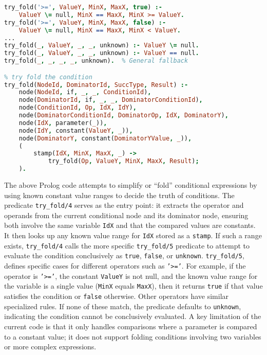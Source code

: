 \begin{lstlisting}[language=Prolog]
% Constant condition: value stamp available and deterministic
try_fold('>=', ValueY, MinX, MaxX, true) :- 
    ValueY \= null, MinX == MaxX, MinX >= ValueY.
try_fold('>=', ValueY, MinX, MaxX, false) :- 
    ValueY \= null, MinX == MaxX, MinX < ValueY.
...
try_fold(_, ValueY, _, _, unknown) :- ValueY \= null.
try_fold(_, ValueY, _, _, unknown) :- ValueY == null.
try_fold(_, _, _, _, unknown).  % General fallback

% try fold the condition
try_fold(NodeId, DominatorId, SuccType, Result) :-
    node(NodeId, if, _, _, ConditionId),
    node(DominatorId, if, _, _, DominatorConditionId),
    node(ConditionId, Op, IdX, IdY),
    node(DominatorConditionId, DominatorOp, IdX, DominatorY),
    node(IdX, parameter(_)),
    node(IdY, constant(ValueY, _)),
    node(DominatorY, constant(DominatorYValue, _)),
    (
        stamp(IdX, MinX, MaxX, _) ->
            try_fold(Op, ValueY, MinX, MaxX, Result);
    ).
\end{lstlisting}
\smallbreak
The above Prolog code attempts to simplify or “fold” conditional expressions by using known constant value ranges to decide the truth of conditions. The predicate \texttt{try\_fold/4} serves as the entry point: it extracts the operator and operands from the current conditional node and its dominator node, ensuring both involve the same variable \texttt{IdX} and that the compared values are constants. It then looks up any known value range for \texttt{IdX} stored as a \texttt{stamp}. If such a range exists, \texttt{try\_fold/4} calls the more specific \texttt{try\_fold/5} predicate to attempt to evaluate the condition conclusively as \texttt{true}, \texttt{false}, or \texttt{unknown}. \texttt{try\_fold/5}, defines specific cases for different operators such as \texttt{'>='}. For example, if the operator is \texttt{'>='}, the constant \texttt{ValueY} is not null, and the known value range for the variable is a single value (\texttt{MinX} equals \texttt{MaxX}), then it returns \texttt{true} if that value satisfies the condition or \texttt{false} otherwise. Other operators have similar specialized rules. If none of these match, the predicate defaults to \texttt{unknown}, indicating the condition cannot be conclusively evaluated.
A key limitation of the current code is that it only handles comparisons where a parameter is compared to a constant value; it does not support folding conditions involving two variables or more complex expressions.

